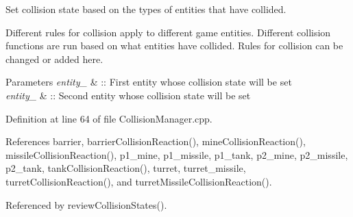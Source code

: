Set collision state based on the types of entities that have collided. 

Different rules for collision apply to different game entities. Different collision functions are run based on what entities have collided. Rules for collision can be changed or added here. 
\begin{DoxyParams}{Parameters}
{\em entity\-\_} & \-:\-: First entity whose collision state will be set \\
\hline
{\em entity\-\_} & \-:\-: Second entity whose collision state will be set \\
\hline
\end{DoxyParams}


Definition at line 64 of file Collision\-Manager.\-cpp.



References barrier, barrier\-Collision\-Reaction(), mine\-Collision\-Reaction(), missile\-Collision\-Reaction(), p1\-\_\-mine, p1\-\_\-missile, p1\-\_\-tank, p2\-\_\-mine, p2\-\_\-missile, p2\-\_\-tank, tank\-Collision\-Reaction(), turret, turret\-\_\-missile, turret\-Collision\-Reaction(), and turret\-Missile\-Collision\-Reaction().



Referenced by review\-Collision\-States().


